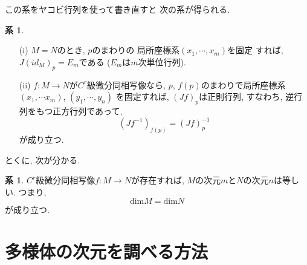 \documentclass[a4j,12pt]{jarticle}
\theoremstyle{definition}
\newtheorem{corollary}[theorem]{系}
\begin{document}
この系をヤコビ行列を使って書き直すと
次の系が得られる. 
\begin{corollary}
    \begin{itemize}
        \item[(i)]$M=N$のとき, $p$のまわりの
        局所座標系$(x_1,\cdots ,x_m)$を固定
        すれば, $J(id_M)_p=E_m$である
        ($E_m$は$m$次単位行列). 
        \item[(ii)]
        $f:M\to N$が$C^r$級微分同相写像なら, 
        $p$, $f(p)$のまわりで局所座標系
        $(x_1,\cdots x_m)$, $(y_1,\cdots ,y_n)$
        を固定すれば, $(Jf)_p$は正則行列, 
        すなわち, 逆行列をもつ正方行列であって, 
        $$(Jf^{-1})_{f(p)}=(Jf)_p^{-1}$$
        が成り立つ. 
    \end{itemize}
\end{corollary}
とくに, 次が分かる. 
\begin{corollary}\label{coro:dim equality by diffeomorphism}
    $C^r$級微分同相写像$f:M\to N$が存在すれば, 
    $M$の次元$m$と$N$の次元$n$は等しい. つまり, 
    $$\text{dim}M=\text{dim}N$$
    が成り立つ. 
\end{corollary}
\newpage


\section{多様体の次元を調べる方法}
\end{document}
